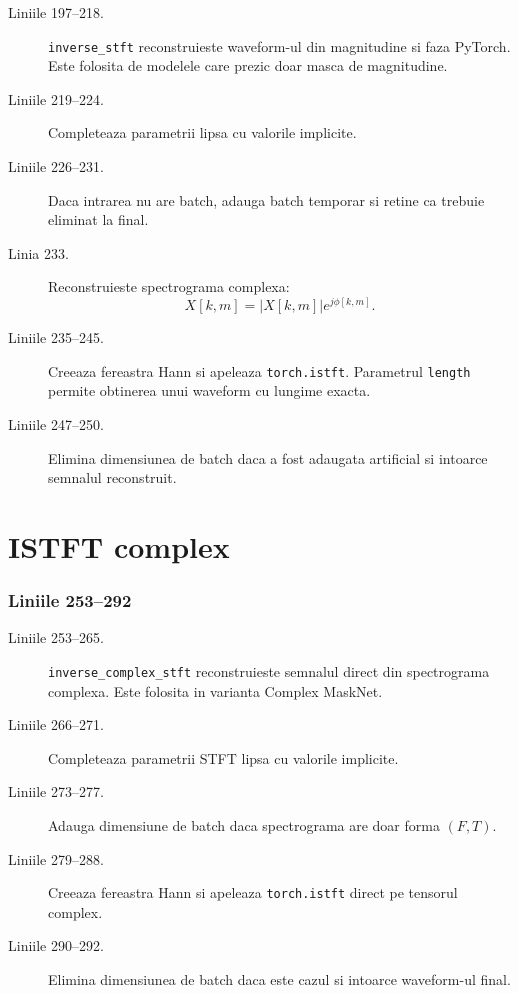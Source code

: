 \documentclass[12pt,a4paper]{report}
\newcommand{\codechunk}[2]{%
\subsection*{Liniile #1--#2}

}
\begin{document}
\begin{description}
    \item[Liniile 197--218.] \texttt{inverse\_stft} reconstruieste waveform-ul din
    magnitudine si faza PyTorch. Este folosita de modelele care prezic doar masca
    de magnitudine.

    \item[Liniile 219--224.] Completeaza parametrii lipsa cu valorile implicite.

    \item[Liniile 226--231.] Daca intrarea nu are batch, adauga batch temporar si
    retine ca trebuie eliminat la final.

    \item[Linia 233.] Reconstruieste spectrograma complexa:
    \[
    X[k,m] = |X[k,m]|e^{j\phi[k,m]}.
    \]

    \item[Liniile 235--245.] Creeaza fereastra Hann si apeleaza \texttt{torch.istft}.
    Parametrul \texttt{length} permite obtinerea unui waveform cu lungime exacta.

    \item[Liniile 247--250.] Elimina dimensiunea de batch daca a fost adaugata
    artificial si intoarce semnalul reconstruit.
\end{description}

\chapter{ISTFT complex}

\codechunk{253}{292}

\begin{description}
    \item[Liniile 253--265.] \texttt{inverse\_complex\_stft} reconstruieste semnalul
    direct din spectrograma complexa. Este folosita in varianta Complex MaskNet.

    \item[Liniile 266--271.] Completeaza parametrii STFT lipsa cu valorile implicite.

    \item[Liniile 273--277.] Adauga dimensiune de batch daca spectrograma are doar
    forma \((F,T)\).

    \item[Liniile 279--288.] Creeaza fereastra Hann si apeleaza \texttt{torch.istft}
    direct pe tensorul complex.

    \item[Liniile 290--292.] Elimina dimensiunea de batch daca este cazul si intoarce
    waveform-ul final.
\end{description}
\end{document}
